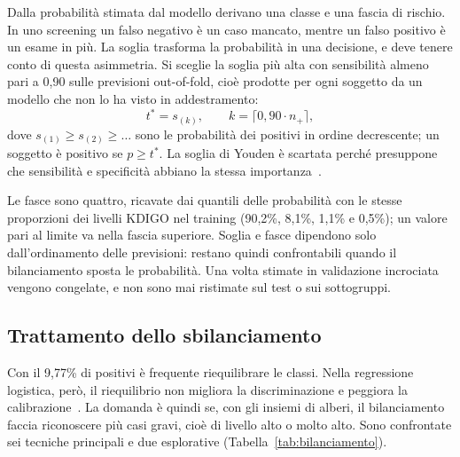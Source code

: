 \documentclass[a4paper, 12pt, oneside]{book}
\begin{document}
Dalla probabilità stimata dal modello derivano una classe e una fascia di rischio. In uno screening un falso negativo è un caso mancato, mentre un falso positivo è un esame in più. La soglia trasforma la probabilità in una decisione, e deve tenere conto di questa asimmetria. Si sceglie la soglia più alta con sensibilità almeno pari a 0,90 sulle previsioni out-of-fold, cioè prodotte per ogni soggetto da un modello che non lo ha visto in addestramento:
\begin{equation}
	t^{*} = s_{(k)}, \qquad k = \lceil 0{,}90 \cdot n_{+} \rceil ,
\end{equation}
dove $s_{(1)} \geq s_{(2)} \geq \dots$ sono le probabilità dei positivi in ordine decrescente; un soggetto è positivo se $p \geq t^{*}$. La soglia di Youden è scartata perché presuppone che sensibilità e specificità abbiano la stessa importanza~\cite{van_calster_evaluation_2025}.

Le fasce sono quattro, ricavate dai quantili delle probabilità con le stesse proporzioni dei livelli KDIGO nel training (90,2\%, 8,1\%, 1,1\% e 0,5\%); un valore pari al limite va nella fascia superiore. Soglia e fasce dipendono solo dall'ordinamento delle previsioni: restano quindi confrontabili quando il bilanciamento sposta le probabilità. Una volta stimate in validazione incrociata vengono congelate, e non sono mai ristimate sul test o sui sottogruppi.

\subsection{Trattamento dello sbilanciamento}

Con il 9,77\% di positivi è frequente riequilibrare le classi. Nella regressione logistica, però, il riequilibrio non migliora la discriminazione e peggiora la calibrazione~\cite{van_den_goorbergh_harm_2022}. La domanda è quindi se, con gli insiemi di alberi, il bilanciamento faccia riconoscere più casi gravi, cioè di livello alto o molto alto. Sono confrontate sei tecniche principali e due esplorative (Tabella~\ref{tab:bilanciamento}).
\end{document}
